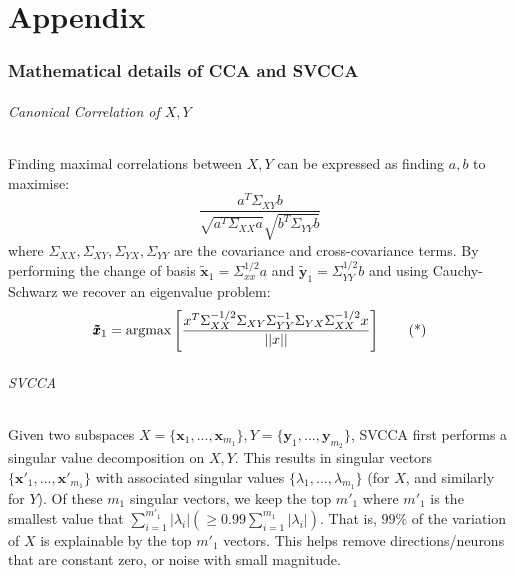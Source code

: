 \documentclass{article} %
\newcommand{\comments}[1]{#1}
\newcommand{\comments}[1]{}
\newcommand{\jcom}[1]{\comments{\textcolor{darkgreen}{[jascha: #1]}}}
\newcommand{\argmax}{\operatornamewithlimits{argmax}}
\begin{document}


% 

\newpage
\clearpage

\appendix
\part*{Appendix}

\setcounter{figure}{0} \renewcommand{\thefigure}{App.\arabic{figure}}
\setcounter{table}{0} \renewcommand{\thetable}{App.\arabic{table}}

 \section{Mathematical details of CCA and SVCCA}
 \label{app-CCA-details}
 
 \paragraph{Canonical Correlation of $X, Y$}
 
  Finding maximal correlations between $X, Y$ can be expressed as finding   $a, b$ to maximise:
\[ \frac{a^T \Sigma_{XY}b}{\sqrt{a^T \Sigma_{XX}a}\sqrt{b^T \Sigma_{YY}b}}\]
where  $\Sigma_{XX}, \Sigma_{XY}, \Sigma_{YX}, \Sigma_{YY}$ are the covariance and cross-covariance terms. By performing the change of basis $\pmb{\tilde{x}}_1 = \Sigma_{xx}^{1/2} a$ and $\pmb{\tilde{y}}_1 = \Sigma_{YY}^{1/2} b$ and using Cauchy-Schwarz we recover an eigenvalue problem:
\[ \pmb{\tilde{x}}_1 = \argmax \left[ \frac{ x^T\Sigma_{XX}^{-1/2}\Sigma_{XY}\Sigma_{YY}^{-1}\Sigma_{YX} \Sigma_{XX}^{-1/2}x}{ ||x||} \right] \tag{*} \]


\paragraph{SVCCA}
 
 Given two subspaces $ X = \{ \pmb{x}_1,..., \pmb{x}_{m_1} \} , Y = \{  \pmb{y}_1,..., \pmb{y}_{m_2} \}$, SVCCA first performs a singular value decomposition on $X, Y$. This results in singular vectors $\{ {\pmb{x'}}_1,..., {\pmb{x'}}_{m_1} \} $ with associated singular values $\{ \lambda_1,...,\lambda_{m_1} \}$ (for $X$, and similarly for $Y$). Of these $m_1$ singular vectors, we keep the top $m'_1$ where $m'_1$ is the smallest value that $\sum_{i=1}^{m'_1} |\lambda_i| (\geq 0.99 \sum_{i=1}^{m_1} | \lambda_i |) $. That is, $99\%$ of the variation of $X$ is explainable by the top $m'_1$ vectors. This helps remove directions/neurons that are constant zero, or noise with small magnitude.
\end{document}
